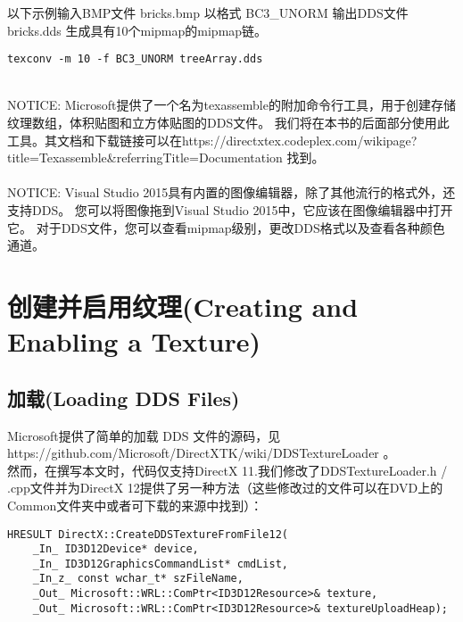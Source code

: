\begin{flushleft}
以下示例输入BMP文件 bricks.bmp 以格式 BC3\_UNORM 输出DDS文件 bricks.dds 生成具有10个mipmap的mipmap链。
\end{flushleft}

\begin{lstlisting}
texconv -m 10 -f BC3_UNORM treeArray.dds
\end{lstlisting}

\begin{flushleft}
~\\
NOTICE:  Microsoft提供了一个名为texassemble的附加命令行工具，用于创建存储纹理数组，体积贴图和立方体贴图的DDS文件。 我们将在本书的后面部分使用此工具。其文档和下载链接可以在https://directxtex.codeplex.com/wikipage?title=Texassemble\&referringTitle=Documentation 找到。\\
~\\
NOTICE: Visual Studio 2015具有内置的图像编辑器，除了其他流行的格式外，还支持DDS。 您可以将图像拖到Visual Studio 2015中，它应该在图像编辑器中打开它。 对于DDS文件，您可以查看mipmap级别，更改DDS格式以及查看各种颜色通道。\\
\end{flushleft}

\section{创建并启用纹理(Creating and Enabling a Texture)}

\subsection{加载(Loading DDS Files)}
\begin{flushleft}
Microsoft提供了简单的加载 DDS 文件的源码，见 https://github.com/Microsoft/DirectXTK/wiki/DDSTextureLoader 。\\
然而，在撰写本文时，代码仅支持DirectX 11.我们修改了DDSTextureLoader.h / .cpp文件并为DirectX 12提供了另一种方法（这些修改过的文件可以在DVD上的Common文件夹中或者可下载的来源中找到）：\\
\end{flushleft}

\begin{lstlisting}
HRESULT DirectX::CreateDDSTextureFromFile12(
    _In_ ID3D12Device* device,
    _In_ ID3D12GraphicsCommandList* cmdList,
    _In_z_ const wchar_t* szFileName,
    _Out_ Microsoft::WRL::ComPtr<ID3D12Resource>& texture,
    _Out_ Microsoft::WRL::ComPtr<ID3D12Resource>& textureUploadHeap);
\end{lstlisting}

